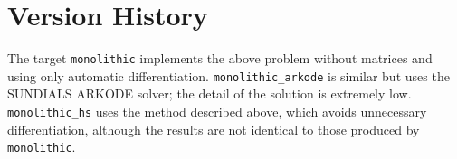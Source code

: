 \documentclass{article}
\begin{document}
\newpage

\section{Version History}

The target \texttt{monolithic} implements the above problem
without matrices and using only automatic differentiation.
\texttt{monolithic\_arkode} is similar
but uses the SUNDIALS ARKODE solver;
the detail of the solution is extremely low.
\texttt{monolithic\_hs} uses the method described above,
which avoids unnecessary differentiation,
although the results are not identical to those produced
by \texttt{monolithic}.
\end{document}
